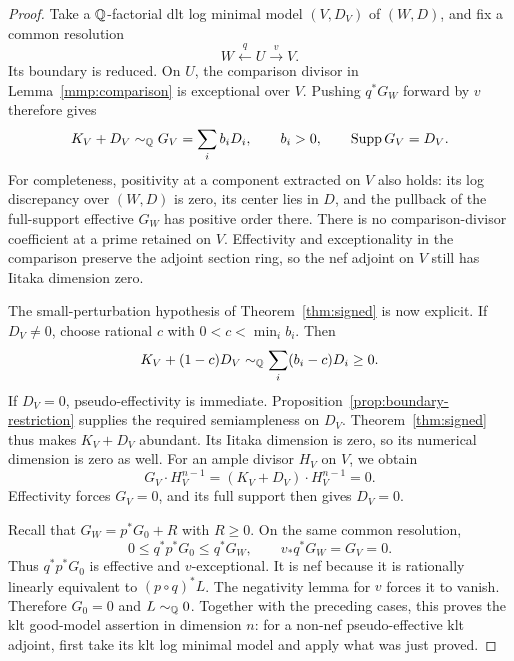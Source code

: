 \begin{proof}
Take a \(\mathbb{Q}\)-factorial dlt log minimal model
\((V,D_V)\) of \((W,D)\), and fix a common resolution
\[
 W\xleftarrow{q}U\xrightarrow{v}V.
\]
Its boundary is reduced. On $U$, the comparison
divisor in Lemma~\ref{mmp:comparison} is exceptional over \(V\).
Pushing $q^*G_W$ forward by $v$ therefore gives
\[
 K_V+D_V\sim_{\mathbb{Q}}G_V=\sum_i b_iD_i,\qquad b_i>0,
 \qquad \operatorname{Supp} G_V=D_V.
\]
For completeness, positivity at a component extracted on \(V\)
also holds: its log discrepancy over \((W,D)\) is zero, its
center lies in \(D\), and the pullback of the full-support
effective \(G_W\) has positive order there.
There is no comparison-divisor coefficient at a prime retained
on \(V\).
Effectivity and exceptionality in the comparison preserve the
adjoint section ring, so the nef adjoint on \(V\) still has
Iitaka dimension zero.

The small-perturbation hypothesis of
Theorem~\ref{thm:signed} is now explicit.
If \(D_V\neq 0\), choose rational \(c\) with
\(0<c<\min_i b_i\). Then
\[
 K_V+(1-c)D_V
 \sim_{\mathbb{Q}}\sum_i(b_i-c)D_i\geq 0.
\]
If \(D_V=0\), pseudo-effectivity is immediate.
Proposition~\ref{prop:boundary-restriction} supplies the
required semiampleness on \(D_V\).
Theorem~\ref{thm:signed} thus makes \(K_V+D_V\) abundant.
Its Iitaka dimension is zero, so its numerical dimension is
zero as well. For an ample divisor $H_V$ on $V$, we obtain
\[
 G_V\cdot H_V^{n-1}=(K_V+D_V)\cdot H_V^{n-1}=0.
\]
Effectivity forces $G_V=0$, and its full support then gives $D_V=0$.

Recall that $G_W=p^*G_0+R$ with $R\ge0$. On the same common
resolution,
\[
 0\le q^*p^*G_0\le q^*G_W,
 \qquad v_*q^*G_W=G_V=0.
\]
Thus $q^*p^*G_0$ is effective and $v$-exceptional. It is nef
because it is rationally linearly equivalent to $(p\circ q)^*L$.
The negativity lemma for $v$ forces it to vanish. Therefore
\(G_0=0\) and \(L\sim_{\mathbb{Q}}0\).
Together with the preceding cases, this proves the klt
good-model assertion in dimension \(n\): for a non-nef
pseudo-effective klt adjoint, first take its klt log minimal
model and apply what was just proved.


\end{proof}
